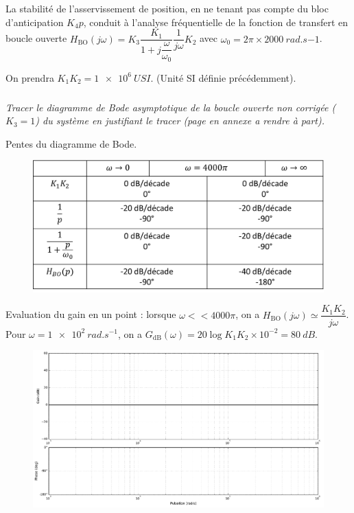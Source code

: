 \documentclass[10pt,fleqn]{article} %
\begin{document}
La stabilité de l’asservissement de position, en ne tenant pas compte du bloc d’anticipation $K_4 p$, conduit à
l’analyse fréquentielle de la fonction de transfert en boucle ouverte $H_{\text{BO}}\left(j\omega\right) = K_3\dfrac{K_1}{1+j\dfrac{\omega }{\omega_0}} \dfrac{1}{j\omega} K_2$ avec $\omega_0 = 2\pi \times \SI{2000}{rad.s{-1}}$.

On prendra $K_1 K_2 = \SI{1e6}{USI}$. (Unité SI définie précédemment). 

\fi

\subparagraph{}\textit{Tracer le diagramme de Bode asymptotique de la boucle ouverte non corrigée ($K_3=1$) du système en justifiant le tracer (page en annexe a rendre à part). }


\ifprof
\begin{corrige}

Pentes du diagramme de Bode. 
\begin{figure}[H]
\centering
\includegraphics[width=0.9\linewidth]{cor_01}
\end{figure}

Evaluation du gain en un point : lorsque $\omega << 4000 \pi$, on a $H_{\text{BO}}\left(j\omega\right) \simeq \dfrac{K_1 K_2}{j\omega}$.
Pour $\omega = \SI{1e2}{rad.s^{-1}}$, on a $G_{\text{dB}}(\omega) = 20\log K_1K_2\times 10^{-2} =\SI{80}{dB}$.


\begin{figure}[H]
\centering
\includegraphics[width=0.9\linewidth]{cor_02}
\end{figure}

\end{corrige}
\else
\fi
\end{document}
